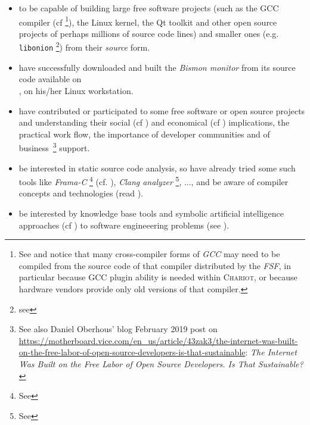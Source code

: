 \begin{itemize}
\item to be capable of building large free software projects (such as
  the GCC compiler (cf \cite{gcc-internals} \footnote{See
     and notice that many cross-compiler
    forms of \emph{GCC} may need to be compiled from the source code
    of that compiler distributed by the \emph{FSF}, in particular
    because GCC plugin ability is needed within \textsc{Chariot}, or
    because hardware vendors provide only old versions of that
    compiler.}), the Linux kernel, the Qt toolkit and other open
  source projects of perhaps millions of source code lines) and
  smaller ones (e.g. \texttt{libonion} \footnote{see
    }) from their \emph{source}
  form.

\item have successfully downloaded and built the \emph{Bismon monitor}
   from its source code  available on
  \\ , on his/her Linux
  workstation.
  
\item have contributed or participated to some free software or open
  source projects and understanding their social (cf
  \cite{Raymond:2001:CathBaz}) and economical (cf
  \cite{Weber:2004:SuccessOpenSource, Tirole:2016:EcoBienCommun,
    Nagle:2018:Contributing, DiCosmo:1998:Holdup,
    Lerner-Tirole:2000:economics-open-source}) implications, the
  practical work flow, the importance of developer communities and of
  business~\footnote{See also Daniel Oberhous' blog February 2019 post
    on
    \url{https://motherboard.vice.com/en_us/article/43zak3/the-internet-was-built-on-the-free-labor-of-open-source-developers-is-that-sustainable}:
    \emph{The Internet Was Built on the Free Labor of Open Source
      Developers. Is That Sustainable?}} support.
  
\item be interested in static source code analysis, so have already
  tried some such tools like \emph{Frama-C} \footnote{See
    } (cf. \cite{Cuoq:2012:Frama-C}),
  \emph{Clang analyzer} \footnote{See
    }, ..., and be aware of
   compiler concepts and technologies (read
  \cite{Aho:2006:DragonBook}).

  \item be interested by knowledge base tools and symbolic artificial
    intelligence approaches (cf \cite{nouira:1996:knowledge,
      Pitrat:1990:Metaconnaissances, Pitrat:1996:FGCS,
      Polito:2014:Bootstrapping-pharo, RAJ-2018-NoSQL,
      Rodriguez:2019:AgileLean, doyle:1985:expert,
      Starynkevitch-1990-EUM}) to software engineeering problems (see
    \cite{rich2014readings, beckert2007verification,
      happel2006applications, rus2002knowledge, Baudin2002CaveatAT,
      TWO:2001:WAPATV, Starynkevitch2007Multistage,
      FITZ:2019:metamodel-cyberphysys}).


\end{itemize}
